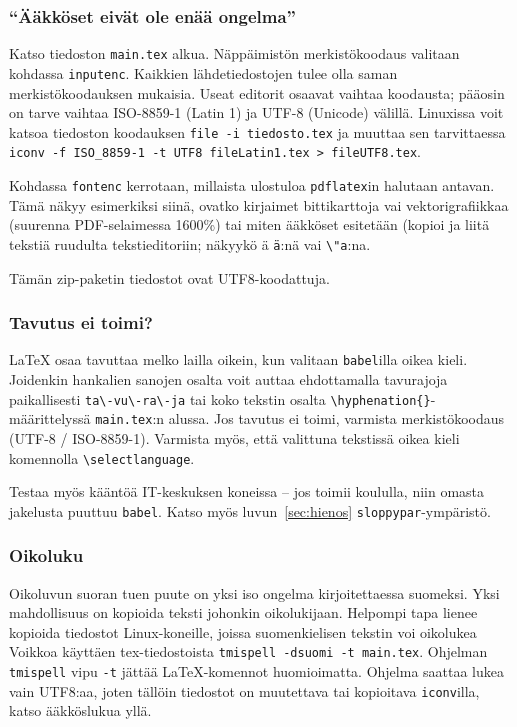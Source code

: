 \subsubsection{``Ääkköset eivät ole enää ongelma''}

Katso tiedoston \verb!main.tex! alkua. Näppäimistön merkistökoodaus
valitaan kohdassa \verb!inputenc!. Kaikkien lähdetiedostojen tulee
olla saman merkistökoodauksen mukaisia.  Useat editorit osaavat
vaihtaa koodausta; pääosin on tarve vaihtaa ISO-8859-1 (Latin 1) ja
UTF-8 (Unicode) välillä. Linuxissa voit katsoa tiedoston koodauksen
\verb!file -i tiedosto.tex! ja muuttaa sen tarvittaessa\\
\verb!iconv -f ISO_8859-1 -t UTF8 fileLatin1.tex > fileUTF8.tex!.

Kohdassa \verb!fontenc! kerrotaan, millaista ulostuloa \verb!pdflatex!in
halutaan antavan. Tämä näkyy esimerkiksi siinä, ovatko kirjaimet
bittikarttoja vai vektorigrafiikkaa (suurenna PDF-selaimessa 1600\%)
tai miten ääkköset esitetään (kopioi ja liitä tekstiä ruudulta 
tekstieditoriin; näkyykö ä \verb!ä!:nä vai \verb!\"a!:na.

Tämän zip-paketin tiedostot ovat UTF8-koodattuja.

\subsubsection{Tavutus ei toimi?}
\label{sec:esim_tavutus}

\LaTeX{} osaa tavuttaa melko lailla oikein, kun valitaan \verb!babel!illa
oikea kieli. Joidenkin hankalien sanojen osalta voit auttaa
ehdottamalla tavurajoja paikallisesti \verb!ta\-vu\-ra\-ja!
tai koko tekstin osalta \verb!\hyphenation{}!-määrittelyssä
\verb!main.tex!:n alussa. Jos tavutus ei toimi, varmista merkistökoodaus
(UTF-8 / ISO-8859-1). Varmista myös, että valittuna tekstissä oikea kieli
komennolla \verb!\selectlanguage!.

Testaa myös kääntöä IT-keskuksen koneissa -- jos
toimii koululla, niin omasta jakelusta puuttuu \verb!babel!.
Katso myös luvun~\ref{sec:hienos} \verb!sloppypar!-ympäristö.

\subsubsection{Oikoluku}

Oikoluvun suoran tuen puute on yksi iso ongelma kirjoitettaessa suomeksi.
Yksi mahdollisuus on kopioida teksti johonkin oikolukijaan. Helpompi
tapa lienee kopioida tiedostot Linux-koneille, joissa
suomenkielisen tekstin voi oikolukea Voikkoa käyttäen tex-tiedostoista
\verb!tmispell -dsuomi -t main.tex!.
Ohjelman \verb!tmispell! vipu \verb!-t! jättää \LaTeX{}-komennot
huomioimatta. Ohjelma saattaa lukea vain UTF8:aa, joten 
tällöin tiedostot on muutettava tai kopioitava \verb!iconv!illa,
katso ääkköslukua yllä.

